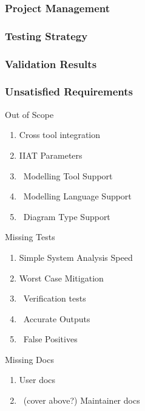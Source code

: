 \documentclass[11pt]{article}
\begin{document}
    \newpage
    \subsubsection{Project Management}\label{subsubsec:proj-mngmnt}

    \newpage
    \subsubsection{Testing Strategy}\label{subsubsec:tests-strat}

    \newpage
    \subsubsection{Validation Results}\label{subsubsec:test-validation}


    \newpage
    \subsubsection{Unsatisfied Requirements} \label{subsubsec:unsat-reqs}
    Out of Scope
    \begin{enumerate}
        \item Cross tool integration
        \item IIAT Parameters
        \item ~Modelling Tool Support
        \item ~Modelling Language Support
        \item ~Diagram Type Support
    \end{enumerate}
    Missing Tests
    \begin{enumerate}
        \item Simple System Analysis Speed
        \item Worst Case Mitigation
        \item ~Verification tests
        \item ~Accurate Outputs
        \item ~False Positives
    \end{enumerate}
    Missing Docs %
    \begin{enumerate}
        \item User docs
        \item ~(cover above?) Maintainer docs
    \end{enumerate}
\end{document}

